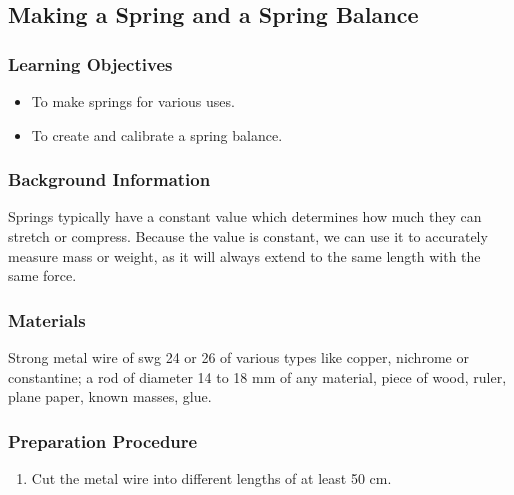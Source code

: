 \subsection{Making a Spring and a Spring Balance}

\subsubsection*{Learning Objectives}
\begin{itemize}
\item{To make springs for various uses.}
\item{To create and calibrate a spring balance.}
\end{itemize}

\subsubsection*{Background Information}
Springs typically have a constant value which determines how much they can stretch or compress.  Because the value is constant, we can use it to accurately measure mass or weight, as it will always extend to the same length with the same force.

\subsubsection*{Materials}
Strong metal wire of swg 24 or 26 of various types like copper, nichrome or constantine; a rod of diameter 14 to 18 mm of any material, piece of wood, ruler, plane paper, known masses, glue.

\subsubsection*{Preparation Procedure}
\begin{enumerate}
\item{Cut the metal wire into different lengths of at least 50 cm.}
\end{enumerate}

